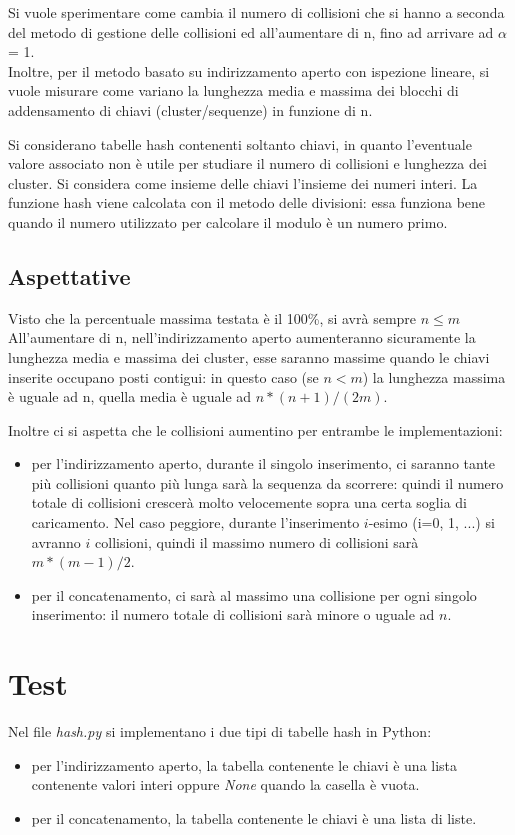 \documentclass[]{article}
\begin{document}
Si vuole sperimentare come cambia il numero di collisioni che si hanno a seconda del metodo di gestione delle collisioni ed all'aumentare di n, fino ad arrivare ad $\alpha$ = 1.\\
Inoltre, per il metodo basato su indirizzamento aperto con ispezione lineare, si vuole misurare come variano la lunghezza media e massima dei blocchi di addensamento di chiavi (cluster/sequenze) in funzione di n.

Si considerano tabelle hash contenenti soltanto chiavi, in quanto l'eventuale valore associato non è utile per studiare il numero di collisioni e lunghezza dei cluster. Si considera come insieme delle chiavi l'insieme dei numeri interi. La funzione hash viene calcolata con il metodo delle divisioni: essa funziona bene quando il numero utilizzato per calcolare il modulo è un numero primo.

\subsection*{Aspettative}
Visto che la percentuale massima testata è il 100\%, si avrà sempre $n \leq m$
All'aumentare di n, nell'indirizzamento aperto aumenteranno sicuramente la lunghezza media e massima dei cluster, esse saranno massime quando le chiavi inserite occupano posti contigui: in questo caso (se $n < m$) la lunghezza massima è uguale ad n, quella media è uguale ad $n*(n+1)/(2m)$.

Inoltre ci si aspetta che  le collisioni aumentino per entrambe le implementazioni:
\begin{itemize}
\item per l'indirizzamento aperto, durante il singolo inserimento, ci saranno tante più collisioni quanto più lunga sarà la sequenza da scorrere: quindi il numero totale di collisioni crescerà molto velocemente sopra una certa soglia di caricamento. Nel caso peggiore, durante l'inserimento $i$-esimo (i=0, 1, ...) si avranno $i$ collisioni, quindi il massimo numero di collisioni sarà $m*(m-1)/2$.
\item per il concatenamento, ci sarà al massimo una collisione per ogni singolo inserimento: il numero totale di collisioni sarà minore o uguale ad $n$.
\end{itemize}

\section{Test}
Nel file \textit{hash.py} si implementano i due tipi di tabelle hash in Python:
\begin{itemize}
\item per l'indirizzamento aperto, la tabella contenente le chiavi è una lista contenente valori interi oppure \textit{None} quando la casella è vuota.
\item per il concatenamento, la tabella contenente le chiavi è una lista di liste.
\end{itemize}
\end{document}

